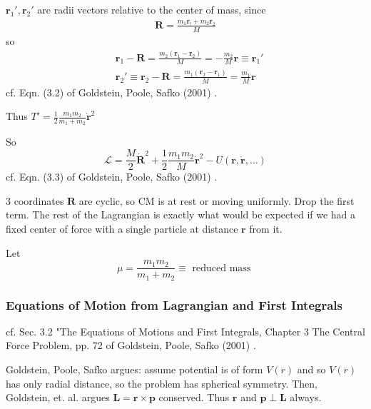\documentclass[10pt]{amsart}
\begin{document}
\begin{multicols*}{2}
$\mathbf{r}_1', \mathbf{r}_2'$ are radii vectors relative to the center of mass, since \\
\[
\begin{gathered}
\mathbf{R} = \frac{m_1 \mathbf{r}_! + m_2 \mathbf{r}_2 }{M}
\end{gathered}
\]
so 
\begin{equation}
\begin{aligned}
& \mathbf{r}_1 - \mathbf{R} = \frac{m_2 (\mathbf{r}_1 - \mathbf{r}_2 )}{ M} = -\frac{m_2}{M} \mathbf{r} \equiv \mathbf{r}_1' \\
&  \mathbf{r}_2' \equiv \mathbf{r}_2 - \mathbf{R} = \frac{m_1(\mathbf{r}_2 - \mathbf{r}_1 )}{ M} = \frac{m_1}{M} \mathbf{r}
\end{aligned}
\end{equation}
cf. Eqn. (3.2) of Goldstein, Poole, Safko (2001) \cite{GPS2001}.

Thus $T' = \frac{1}{2} \frac{m_1 m_2}{m_1 + m_2 } \dot{ \mathbf{r}}^2$

So
\begin{equation}
\mathcal{L} = \frac{M}{2} \dot{\mathbf{R}}^2 + \frac{1}{2} \frac{m_1 m_2}{M} \dot{\mathbf{r}}^2 - U (\mathbf{r}, \dot{\mathbf{r}}, \dots )
\end{equation}
cf. Eqn. (3.3) of Goldstein, Poole, Safko (2001) \cite{GPS2001}.

3 coordinates $\mathbf{R} $ are cyclic, so CM is at rest or moving uniformly. Drop the first term. The rest of the Lagrangian is exactly what would be expected if we had a fixed center of force with a single particle at distance $\mathbf{r}$ from it.

Let 
\[
\mu = \frac{m_1 m_2}{ m _1 + m_2} \equiv \text{ reduced mass }
\]

\subsubsection{Equations of Motion from Lagrangian and First Integrals}

cf. Sec. 3.2 "The Equations of Motions and First Integrals, Chapter 3 The Central Force Problem, pp. 72 of Goldstein, Poole, Safko (2001) \cite{GPS2001}.

Goldstein, Poole, Safko argues: assume potential is of form $V(r)$ and so $V(r)$ has only radial distance, so the problem has spherical symmetry. Then, Goldstein, et. al. argues $\mathbf{L} = \mathbf{r} \times \mathbf{p}$ conserved. Thus $\mathbf{r}$ and $\mathbf{p} \perp \mathbf{L}$ always. 


\end{multicols*}
\end{document}
